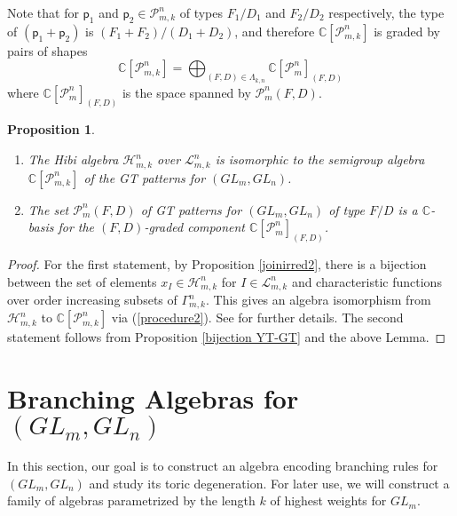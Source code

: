 \documentclass[11pt]{amsart}
\numberwithin{equation}{subsection}
\newtheorem{proposition}[theorem]{Proposition}
\begin{document}
\medskip

Note that for $\mathsf{p}_1$ and $\mathsf{p}_2 \in \mathcal{P}_{m,k}^{n}$ of
types ${F_1}/{D_1}$ and ${F_2}/{D_2}$ respectively, the type of 
$(\mathsf{p}_1 + \mathsf{p}_2)$ is $(F_1 + F_2)/(D_1 + D_2)$, 
and therefore $\mathbb{C}[\mathcal{P}_{m,k}^{n}]$ is graded by pairs of shapes
\begin{equation*}
\mathbb{C}[\mathcal{P}_{m,k}^{n}]=\bigoplus_{(F,D)\in \Lambda _{k,n}}
\mathbb{C}[\mathcal{P}_{m}^{n}]_{(F,D)}
\end{equation*}
where $\mathbb{C}[\mathcal{P}_{m}^{n}]_{(F,D)}$ is the space spanned by 
$\mathcal{P}_{m}^{n}(F,D)$.

\begin{proposition}\label{DL-GT}
\begin{enumerate}
\item The Hibi algebra $\mathcal{H}_{m,k}^{n}$ over 
$\mathcal{L}_{m,k}^{n}$ is isomorphic to the semigroup algebra 
$\mathbb{C}[\mathcal{P}_{m,k}^{n}]$ of the GT patterns for $({GL}_{m},{GL}_{n})$.

\item The set $\mathcal{P}_{m}^{n}(F,D)$ of GT patterns for 
$({GL}_{m},{GL}_{n})$ of type $F/D$ is a $\mathbb{C}$-basis for the 
$(F,D)$-graded component $\mathbb{C}[\mathcal{P}_{m}^{n}]_{(F,D)}$.
\end{enumerate}
\end{proposition}

\begin{proof}
For the first statement, by Proposition \ref{joinirred2}, there is a bijection
between the set of elements $x_{I}\in \mathcal{H}_{m,k}^{n}$ for 
$I\in \mathcal{L}_{m,k}^{n}$ and characteristic functions over order increasing
subsets of $\Gamma _{m,k}^{n}$. This gives an algebra isomorphism from 
$\mathcal{H}_{m,k}^{n}$ to $\mathbb{C}[\mathcal{P}_{m,k}^{n}]$ via 
(\ref{procedure2}). See \cite{How05, Ki08} for further details. The second
statement follows from Proposition \ref{bijection YT-GT} and the above Lemma.
\end{proof}

\medskip


\section{Branching Algebras for $({GL}_{m},{GL}_{n})$}


In this section, our goal is to construct an algebra encoding branching
rules for $({GL}_{m},{GL}_{n})$ and study its toric degeneration. For later
use, we will construct a family of algebras parametrized by the length $k$ of
highest weights for ${GL}_{m}$.
\end{document}
